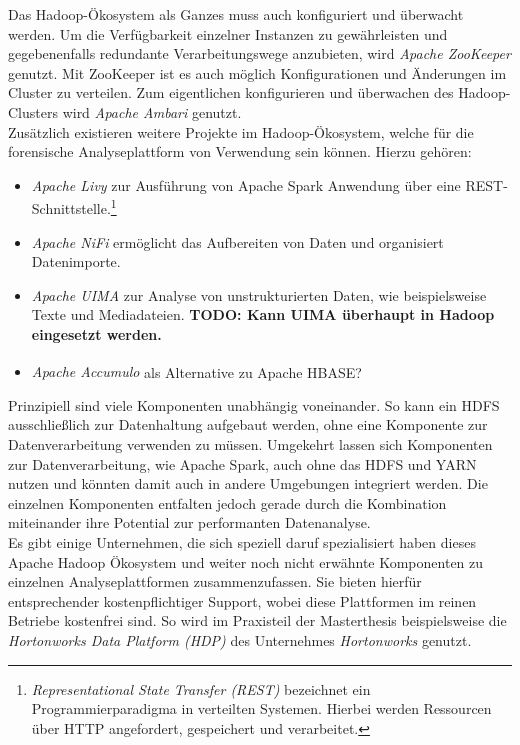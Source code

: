 \noindent
Das Hadoop-Ökosystem als Ganzes muss auch konfiguriert und überwacht werden. Um die Verfügbarkeit einzelner Instanzen zu gewährleisten und gegebenenfalls redundante Verarbeitungswege anzubieten, wird \textit{Apache ZooKeeper\texttrademark\thinspace} genutzt. Mit ZooKeeper ist es auch möglich Konfigurationen und Änderungen im Cluster zu verteilen. Zum eigentlichen konfigurieren und überwachen des Hadoop-Clusters wird \textit{Apache Ambari\texttrademark\thinspace} genutzt.\\

\noindent
Zusätzlich existieren weitere Projekte im Hadoop-Ökosystem, welche für die forensische Analyseplattform von Verwendung sein können.
Hierzu gehören:
\begin{itemize}
\item \textit{Apache Livy} zur Ausführung von Apache Spark Anwendung über eine REST-Schnittstelle.\footnote{\textit{Representational State Transfer (REST)} bezeichnet ein Programmierparadigma in verteilten Systemen. Hierbei werden Ressourcen über HTTP angefordert, gespeichert und verarbeitet.}
\item \textit{Apache NiFi} ermöglicht das Aufbereiten von Daten und organisiert Datenimporte.
\item \textit{Apache UIMA\texttrademark\thinspace} zur Analyse von unstrukturierten Daten, wie beispielsweise Texte und Mediadateien. \textbf{TODO: Kann UIMA überhaupt in Hadoop eingesetzt werden.}
\item \textit{Apache Accumulo\textsuperscript{\textregistered}} als Alternative zu Apache HBASE?
\end{itemize} 

\noindent
Prinzipiell sind viele Komponenten unabhängig voneinander. So kann ein HDFS ausschließlich zur Datenhaltung aufgebaut werden, ohne eine Komponente zur Datenverarbeitung verwenden zu müssen. Umgekehrt lassen sich Komponenten zur Datenverarbeitung, wie Apache Spark, auch ohne das HDFS und YARN nutzen und könnten damit auch in andere Umgebungen integriert werden. Die einzelnen Komponenten entfalten jedoch gerade durch die Kombination miteinander ihre Potential zur performanten Datenanalyse.\\

\noindent
Es gibt einige Unternehmen, die sich speziell daruf spezialisiert haben dieses Apache Hadoop Ökosystem und weiter noch nicht erwähnte Komponenten zu einzelnen Analyseplattformen zusammenzufassen. Sie bieten hierfür entsprechender kostenpflichtiger Support, wobei diese Plattformen im reinen Betriebe kostenfrei sind. So wird im Praxisteil der Masterthesis beispielsweise die \textit{Hortonworks Data Platform (HDP)} des Unternehmes \textit{Hortonworks} genutzt.


